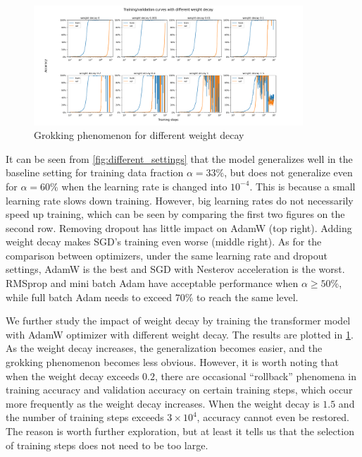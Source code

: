 \begin{figure}[!ht]
    \centering
    \includegraphics[width=0.9\textwidth]{fig/weight_decay/weight_decay.png}
    \caption{Grokking phenomenon for different weight decay}
    \label{fig:different weight_decay}
\end{figure}

It can be seen from \cref{fig:different_settings} that the model generalizes well in the baseline setting for training data fraction $\alpha = 33\%$, but does not generalize even for $\alpha = 60\%$ when the learning rate is changed into $10^{-4}$.
This is because a small learning rate slows down training.
However, big learning rates do not necessarily speed up training, which can be seen by comparing the first two figures on the second row. 
Removing dropout has little impact on AdamW (top right).
Adding weight decay makes SGD's training even worse (middle right).
As for the comparison between optimizers, under the same learning rate and dropout settings, AdamW is the best and SGD with Nesterov acceleration is the worst.
RMSprop and mini batch Adam have acceptable performance when $\alpha \geq 50\%$, while full batch Adam needs to exceed $70\%$ to reach the same level.

We further study the impact of weight decay by training the transformer model with AdamW optimizer with different weight decay.
The results are plotted in \cref{fig:different weight_decay}.
As the weight decay increases, the generalization becomes easier, and the grokking phenomenon becomes less obvious. 
However, it is worth noting that when the weight decay exceeds $0.2$, there are occasional ``rollback'' phenomena in training accuracy and validation accuracy on certain training steps, which occur more frequently as the weight decay increases. 
When the weight decay is $1.5$ and the number of training steps exceeds $3 \times 10^4$, accuracy cannot even be restored. 
The reason is worth further exploration, but at least it tells us that the selection of training steps does not need to be too large.